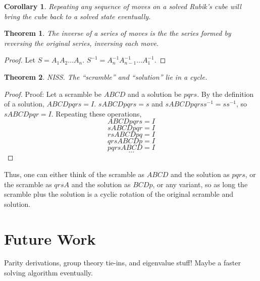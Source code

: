 \documentclass[11pt, oneside]{article}
\theoremstyle{plain}
\newtheorem{theorem}{Theorem}[section]
\newtheorem{corollary}{Corollary}[theorem]
\begin{document}
\begin{corollary}
Repeating any sequence of moves on a solved Rubik's cube will bring
the cube back to a solved state eventually.
\end{corollary}

\begin{theorem}
The inverse of a series of moves is the the series formed by reversing the original series, inversing each move.
\end{theorem}

\begin{proof}
Let \( S = A_1 A_2 \dots A_n \). \( S^{-1} =  A_n^{-1} A_{n - 1}^{-1} \dots A_1^{-1} \).
\end{proof}

\newpage

\begin{theorem}
NISS. The ``scramble'' and ``solution'' lie in a cycle.
\end{theorem}

\begin{proof}
Proof: Let a scramble be \( ABCD \) and a solution be \( pqrs \).
By the definition of a solution, \( ABCDpqrs = I \).
\( sABCDpqrs = s \) and \( sABCDpqrss^{-1} = ss^{-1} \), so
\( sABCDpqr = I \).
Repeating these operations,
\[ ABCDpqrs = I \]
\[ sABCDpqr = I \]
\[ rsABCDpq = I \]
\[ qrsABCDp = I \]
\[ pqrsABCD = I \]
\[ \dots \]
\end{proof}

Thus, one can either think of the scramble as \( ABCD \) and the solution as
\( pqrs \), or the scramble as \( qrsA \) and the solution as \( BCDp \),
or any variant, so as long the scramble plus the solution is a cyclic rotation of the original scramble and solution.

\section{Future Work}

Parity derivations, group theory tie-ins, and eigenvalue stuff!
Maybe a faster solving algorithm eventually.
\end{document}
